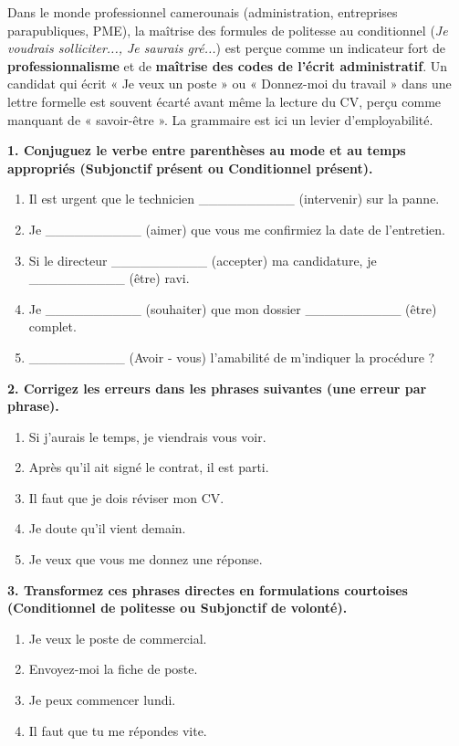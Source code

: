 \documentclass[11pt]{article}
\begin{document}
\begin{savaistu}
Dans le monde professionnel camerounais (administration, entreprises parapubliques, PME), la maîtrise des formules de politesse au conditionnel (\emph{Je voudrais solliciter..., Je saurais gré...}) est perçue comme un indicateur fort de \textbf{professionnalisme} et de \textbf{maîtrise des codes de l'écrit administratif}. Un candidat qui écrit « Je veux un poste » ou « Donnez-moi du travail » dans une lettre formelle est souvent écarté avant même la lecture du CV, perçu comme manquant de « savoir-être ». La grammaire est ici un levier d'employabilité.
\end{savaistu}

\begin{exercice}
\textbf{1. Conjuguez le verbe entre parenthèses au mode et au temps appropriés (Subjonctif présent ou Conditionnel présent).}
\begin{enumerate}
    \item Il est urgent que le technicien \_\_\_\_\_\_\_\_\_\_ (intervenir) sur la panne.
    \item Je \_\_\_\_\_\_\_\_\_\_ (aimer) que vous me confirmiez la date de l'entretien.
    \item Si le directeur \_\_\_\_\_\_\_\_\_\_ (accepter) ma candidature, je \_\_\_\_\_\_\_\_\_\_ (être) ravi.
    \item Je \_\_\_\_\_\_\_\_\_\_ (souhaiter) que mon dossier \_\_\_\_\_\_\_\_\_\_ (être) complet.
    \item \_\_\_\_\_\_\_\_\_\_ (Avoir - vous) l'amabilité de m'indiquer la procédure ?
\end{enumerate}

\textbf{2. Corrigez les erreurs dans les phrases suivantes (une erreur par phrase).}
\begin{enumerate}
    \item Si j'aurais le temps, je viendrais vous voir.
    \item Après qu'il ait signé le contrat, il est parti.
    \item Il faut que je dois réviser mon CV.
    \item Je doute qu'il vient demain.
    \item Je veux que vous me donnez une réponse.
\end{enumerate}

\textbf{3. Transformez ces phrases directes en formulations courtoises (Conditionnel de politesse ou Subjonctif de volonté).}
\begin{enumerate}
    \item Je veux le poste de commercial.
    \item Envoyez-moi la fiche de poste.
    \item Je peux commencer lundi.
    \item Il faut que tu me répondes vite.
\end{enumerate}
\end{exercice}
\end{document}
